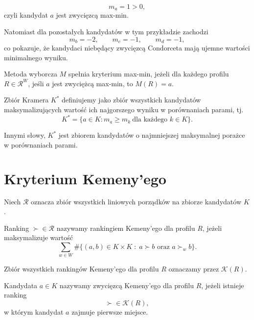 \documentclass[12pt,a4paper]{mwrep}
\begin{document}
	\[
	m_a = 1 > 0,
	\]
	czyli kandydat \(a\) jest zwycięzcą max-min.
	
	Natomiast dla pozostałych kandydatów w tym przykładzie zachodzi
	\[
	m_b = -2, \qquad
	m_c = -1, \qquad
	m_d = -1,
	\]
	co pokazuje, że kandydaci niebędący zwycięzcą Condorceta mają ujemne wartości minimalnego wyniku.
	
	\begin{definition}
		\label{def:kryterium_max-min}
		Metoda wyborcza \(M\) spełnia kryterium max-min, jeżeli dla każdego profilu \(R \in \mathcal{R}^W\), jeśli \(a\) jest zwyciężcą max-min, to \(M(R) = a\).
	\end{definition}

	
	\begin{definition}
		Zbiór Kramera \(K^\ast\) definiujemy jako zbiór wszystkich kandydatów maksymalizujących wartość ich najgorszego wyniku w porównaniach parami, tj.
		\[
		K^\ast = \{a \in K : m_a \ge m_k \ \text{dla każdego } k \in K\}.
		\]
	\end{definition}
	
	Innymi słowy, \(K^\ast\) jest zbiorem kandydatów o najmniejszej maksymalnej porażce w porównaniach parami.
	
	\section{Kryterium Kemeny'ego}
	
	\begin{definition}
		\label{def:ranking-kemeny}
		Niech \(\mathcal R\) oznacza zbiór wszystkich liniowych porządków na zbiorze kandydatów \(K\).
		
		Ranking \(\succ \in \mathcal R\) nazywamy rankingiem Kemeny’ego dla profilu \(R\), jeżeli maksymalizuje wartość
		\[
		\sum_{w \in W}
		\#\{(a,b)\in K\times K \;:\; a \succ b \text{ oraz } a \succ_w b\}.
		\]
		
		Zbiór wszystkich rankingów Kemeny’ego dla profilu \(R\) oznaczamy przez \(\mathcal K(R)\).
	\end{definition}

	
	\begin{definition}
		\label{def:zwyciezca-kemeny}
		Kandydata \(a \in K\) nazywamy zwycięzcą Kemeny’ego dla profilu \(R\), jeżeli istnieje ranking
		\[
		\succ \in \mathcal K(R),
		\]
		w którym kandydat \(a\) zajmuje pierwsze miejsce.
	\end{definition}
\end{document}
